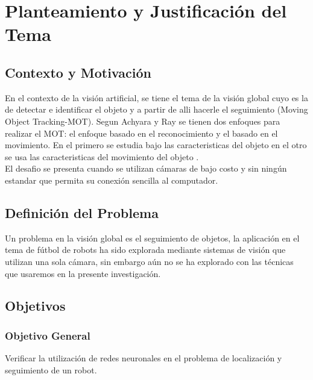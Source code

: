 
\chapter{Planteamiento y Justificaci\'on del Tema}
\section{Contexto y Motivaci\'on}
En el contexto de la visi\'on artificial, se tiene el tema de la visi\'on global cuyo  es la de detectar e identificar el objeto y  a partir de alli hacerle el seguimiento (Moving Object Tracking-MOT). Segun Achyara y Ray  se tienen dos enfoques para realizar el MOT: el enfoque basado en el reconocimiento y el basado en el movimiento. En el primero se estudia bajo las caracteristicas del objeto en el otro se usa las caracteristicas del movimiento del objeto \cite{acharya_g}.\\
El desafio se presenta cuando se utilizan c\'amaras de bajo costo y sin ning\'un estandar que permita su conexi\'on sencilla al computador.

\section{Definici\'on del Problema}
Un problema en la visi\'on global es el seguimiento de objetos, la aplicaci\'on en el tema de f\'utbol de robots ha sido explorada mediante sistemas de visi\'on que utilizan una sola c\'amara, sin embargo a\'un no se ha explorado con las t\'ecnicas que usaremos en la presente investigaci\'on.
\section{Objetivos}
\subsection{Objetivo General}
Verificar la utilizaci\'on de redes neuronales en el problema de localizaci\'on y seguimiento de un robot.
